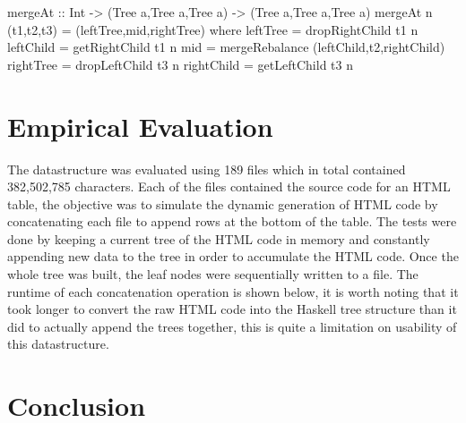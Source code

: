 \documentclass[11pt,a4paper,oneside]{article}
\begin{document}
\begin{haskell}

mergeAt :: Int -> (Tree a,Tree a,Tree a) -> (Tree a,Tree a,Tree a)
mergeAt n (t1,t2,t3) = (leftTree,mid,rightTree)
                where leftTree   = dropRightChild t1 n
                      leftChild  = getRightChild t1 n
                      mid        = mergeRebalance (leftChild,t2,rightChild)
                      rightTree  = dropLeftChild t3 n
                      rightChild = getLeftChild t3 n

\end{haskell}

\section{Empirical Evaluation}

The datastructure was evaluated using 189 files which in total contained 382,502,785 characters. Each of the files contained the source code for an HTML table, the objective was to simulate the dynamic generation of HTML code by concatenating each file to append rows at the bottom of the table. The tests were done by keeping a current tree of the HTML code in memory and constantly appending new data to the tree in order to accumulate the HTML code. Once the whole tree was built, the leaf nodes were sequentially written to a file. The runtime of each concatenation operation is shown below, it is worth noting that it took longer to convert the raw HTML code into the Haskell tree structure than it did to actually append the trees together, this is quite a limitation on usability of this datastructure. 




\section{Conclusion}



\end{document}
